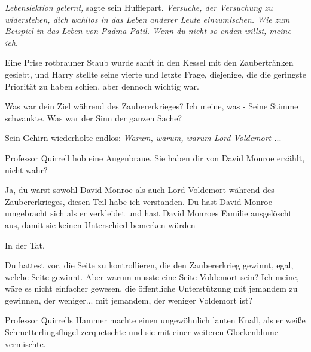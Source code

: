 \emph{Lebenslektion gelernt,} sagte sein Hufflepart. \emph{Versuche, der
Versuchung zu widerstehen, dich wahllos in das Leben anderer Leute einzumischen.
Wie zum Beispiel in das Leben von Padma Patil. Wenn du nicht so enden willst,
meine ich}.

Eine Prise rotbrauner Staub wurde sanft in den Kessel mit den Zaubertränken
gesiebt, und Harry stellte seine vierte und letzte Frage, diejenige, die die
geringste Priorität zu haben schien, aber dennoch wichtig war.

\glqq{}Was war dein Ziel während des Zaubererkrieges? Ich meine, was -\grqq{} Seine
Stimme schwankte. \glqq{}Was war der Sinn der ganzen Sache?\grqq{}

Sein Gehirn wiederholte endlos: \emph{Warum, warum, warum Lord Voldemort .}..

Professor Quirrell hob eine Augenbraue. \glqq{}Sie haben dir von David Monroe
erzählt, nicht wahr?\grqq{}

\glqq{}Ja, du warst sowohl David Monroe als auch Lord Voldemort während des
Zaubererkrieges, diesen Teil habe ich verstanden. Du hast David Monroe
umgebracht sich als er verkleidet und hast David Monroes Familie ausgelöscht
aus, damit sie keinen Unterschied bemerken würden -\grqq{}

\glqq{}In der Tat.\grqq{}

\glqq{}Du hattest vor, die Seite zu kontrollieren, die den Zaubererkrieg gewinnt,
egal, welche Seite gewinnt. Aber warum musste eine Seite Voldemort sein? Ich
meine, wäre es nicht einfacher gewesen, die öffentliche Unterstützung mit
jemandem zu gewinnen, der weniger... mit jemandem, der weniger Voldemort
ist?\grqq{}

Professor Quirrells Hammer machte einen ungewöhnlich lauten Knall, als er weiße
Schmetterlingsflügel zerquetschte und sie mit einer weiteren Glockenblume
vermischte.

